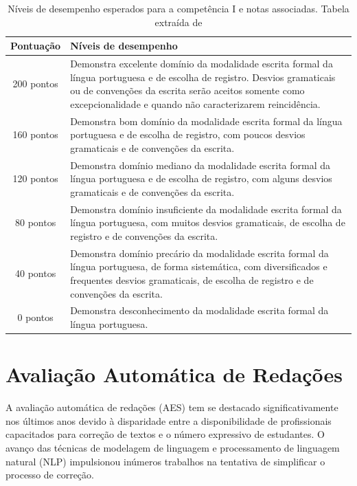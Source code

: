\begin{table}[H]
    \centering
    \caption{Níveis de desempenho esperados para a competência I e notas associadas. Tabela extraída de \cite[p.~10]{cartilha-redacao}}
    \label{tab:competencia-1}
    \begin{tabularx}{\textwidth}{cX}
        \toprule
        \textbf{Pontuação} & \textbf{Níveis de desempenho} \\
        \midrule
        200 pontos & Demonstra excelente domínio da modalidade escrita formal da língua portuguesa e de escolha de registro. Desvios gramaticais ou de convenções da escrita serão aceitos somente como excepcionalidade e quando não caracterizarem reincidência. \\
        160 pontos & Demonstra bom domínio da modalidade escrita formal da língua portuguesa e de escolha de registro, com poucos desvios gramaticais e de convenções da escrita. \\
        120 pontos & Demonstra domínio mediano da modalidade escrita formal da língua portuguesa e de escolha de registro, com alguns desvios gramaticais e de convenções da escrita. \\
        80 pontos & Demonstra domínio insuficiente da modalidade escrita formal da língua portuguesa, com muitos desvios gramaticais, de escolha de registro e de convenções da escrita. \\
        40 pontos & Demonstra domínio precário da modalidade escrita formal da língua portuguesa, de forma sistemática, com diversificados e frequentes desvios gramaticais, de escolha de registro e de convenções da escrita. \\
        0 pontos & Demonstra desconhecimento da modalidade escrita formal da língua portuguesa. \\
        \bottomrule
    \end{tabularx}
\end{table}

\section{Avaliação Automática de Redações}

A avaliação automática de redações (AES) tem se destacado significativamente nos últimos anos devido à disparidade entre a disponibilidade de profissionais capacitados para correção de textos e o número expressivo de estudantes. O avanço das técnicas de modelagem de linguagem e processamento de linguagem natural (NLP) impulsionou inúmeros trabalhos na tentativa de simplificar o processo de correção.

